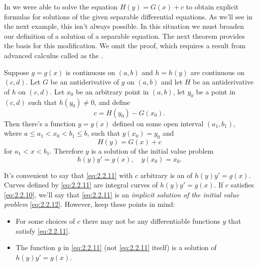
In  we were able to
solve the equation $H(y)=G(x)+c$ to obtain explicit formulas for
solutions of the given separable differential equations. As we'll
see in the next example, this isn't  always possible.
In this situation we must broaden our definition of a solution of a
separable equation. The next theorem provides the basis for this
modification.  We omit the proof, which requires a result from
advanced calculus called as the .

\begin{theorem}\label{thmtype:2.2.1}
Suppose $g=g(x)$ is continuous on $(a,b)$ and $h=h(y)$
are continuous on $(c,d)$. Let $G$ be an antiderivative of
$g$ on $(a,b)$ and let $H$ be an antiderivative of $h$ on $(c,d)$.
Let $x_0$ be an arbitrary point in $(a,b)$, let $y_0$
be a point in $(c,d)$ such that $h(y_0)\ne0$, and define
\begin{equation} \label{eq:2.2.10}
c=H(y_0)-G(x_0).
\end{equation}
Then there's a function $y=y(x)$ defined on some open interval
$(a_1,b_1)$, where $a\le a_1<x_0<b_1\le b$, such that  $y(x_0)=y_0$
and
\begin{equation} \label{eq:2.2.11}
H(y)=G(x)+c
\end{equation}
for $a_1<x<b_1$.
Therefore $y$ is a solution of the initial value problem
\begin{equation} \label{eq:2.2.12}
h(y)y'=g(x),\quad y(x_0)=x_0.
\end{equation}
\end{theorem}


It's convenient to say that \eqref{eq:2.2.11} with $c$ arbitrary is an
 of $h(y)y'=g(x)$. Curves defined by
\eqref{eq:2.2.11} are integral curves of $h(y)y'=g(x)$. If $c$ satisfies
\eqref{eq:2.2.10}, we'll say that \eqref{eq:2.2.11} is an
\emph{\color{blue}implicit solution of the initial value problem}
\eqref{eq:2.2.12}. However, keep
these  points in mind:
\begin{itemize}
\item  For some choices of $c$ there may not be any differentiable
functions $y$ that satisfy \eqref{eq:2.2.11}.
\item  The function $y$ in \eqref{eq:2.2.11} (not \eqref{eq:2.2.11} itself)
is a solution of $h(y)y'=g(x)$.
\end{itemize}

